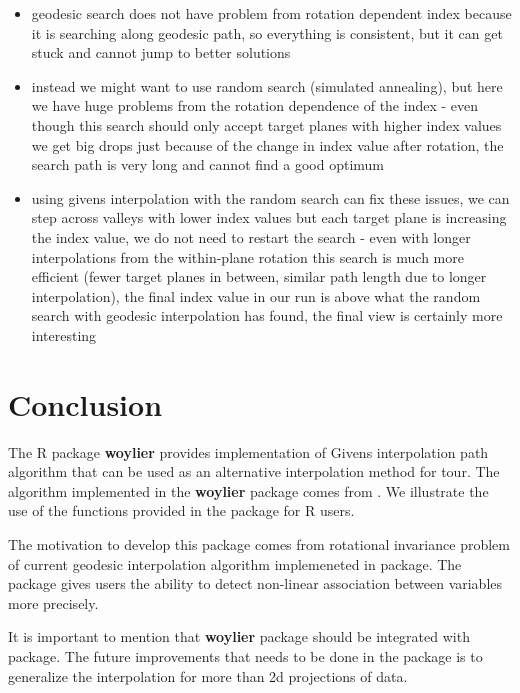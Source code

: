 \begin{itemize}
\tightlist
\item
  geodesic search does not have problem from rotation dependent index
  because it is searching along geodesic path, so everything is
  consistent, but it can get stuck and cannot jump to better solutions
\item
  instead we might want to use random search (simulated annealing), but
  here we have huge problems from the rotation dependence of the index -
  even though this search should only accept target planes with higher
  index values we get big drops just because of the change in index
  value after rotation, the search path is very long and cannot find a
  good optimum
\item
  using givens interpolation with the random search can fix these
  issues, we can step across valleys with lower index values but each
  target plane is increasing the index value, we do not need to restart
  the search - even with longer interpolations from the within-plane
  rotation this search is much more efficient (fewer target planes in
  between, similar path length due to longer interpolation), the final
  index value in our run is above what the random search with geodesic
  interpolation has found, the final view is certainly more interesting
\end{itemize}

\hypertarget{conclusion}{%
\section{Conclusion}\label{conclusion}}

The R package \textbf{woylier} provides implementation of Givens
interpolation path algorithm that can be used as an alternative
interpolation method for tour. The algorithm implemented in the
\textbf{woylier} package comes from
\citet{buja_cook_asimov_hurley_2005}. We illustrate the use of the
functions provided in the package for R users.

The motivation to develop this package comes from rotational invariance
problem of current geodesic interpolation algorithm implemeneted in
 package. The package gives users the ability to detect
non-linear association between variables more precisely.

It is important to mention that \textbf{woylier} package should be
integrated with  package. The future improvements that
needs to be done in the package is to generalize the interpolation for
more than 2d projections of data.

